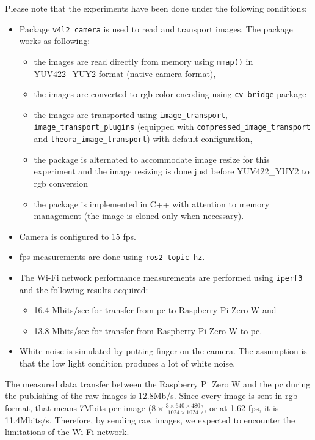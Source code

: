 Please note that the experiments have been done under the following conditions:
\begin{itemize}
    \item Package \texttt{v4l2\_camera} is used to read and transport images. The package works as following:
        \begin{itemize}
            \item the images are read directly from memory using \texttt{mmap()} in YUV422\_YUY2 format (native camera format),
            \item the images are converted to \ac{rgb} color encoding using \texttt{cv\_bridge} package
            \item the images are transported using \texttt{image\_transport}, \texttt{image\_transport\_plugins} (equipped with \texttt{compressed\_image\_transport} and \texttt{theora\_image\_transport}) with default configuration,
            \item the package is alternated to accommodate image resize for this experiment and the image resizing is done just before YUV422\_YUY2 to \ac{rgb} conversion
            \item the package is implemented in C++ with attention to memory management (the image is cloned only when necessary).
        \end{itemize}
    \item Camera is configured to 15 \ac{fps}.
    \item \ac{fps} measurements are done using \texttt{ros2 topic hz}.
    \item The Wi-Fi network performance measurements are performed using \texttt{iperf3} and the following results acquired:
        \begin{itemize}
            \item 16.4 Mbits/sec for transfer from \ac{pc} to Raspberry Pi Zero W and
            \item 13.8 Mbits/sec for transfer from Raspberry Pi Zero W to \ac{pc}.
        \end{itemize}
    \item White noise is simulated by putting finger on the camera.
    The assumption is that the low light condition produces a lot of white noise. 
\end{itemize}

The measured data transfer between the Raspberry Pi Zero W and the \ac{pc} during the publishing of the raw images is 12.8Mb/s.
Since every image is sent in \ac{rgb} format, that means 7Mbits per image ($ 8 \times \frac{ 3 \times 640 \times 480 }{1024 \times 1024}$), or at 1.62 \ac{fps}, it is 11.4Mbits/s.
Therefore, by sending raw images, we expected to encounter the limitations of the Wi-Fi network.

